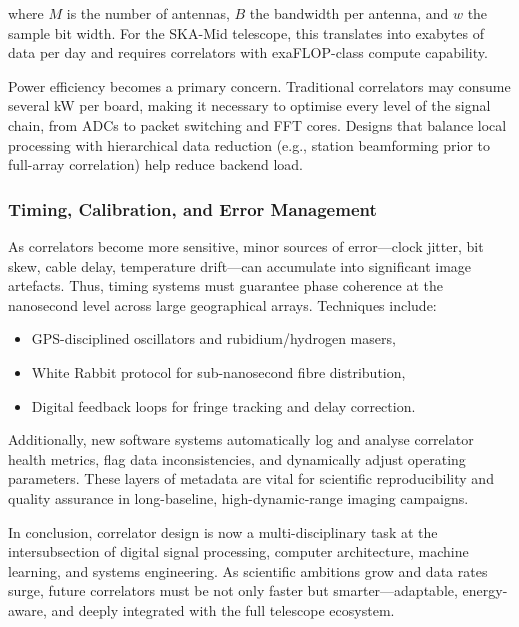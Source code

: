         where \( M \) is the number of antennas, \( B \) the bandwidth per antenna, and \( w \) the sample bit width. For the SKA-Mid telescope, this translates into exabytes of data per day and requires correlators with exaFLOP-class compute capability.
        
        Power efficiency becomes a primary concern. Traditional correlators may consume several kW per board, making it necessary to optimise every level of the signal chain, from ADCs to packet switching and FFT cores. Designs that balance local processing with hierarchical data reduction (e.g., station beamforming prior to full-array correlation) help reduce backend load.

        \subsubsection{Timing, Calibration, and Error Management}
        As correlators become more sensitive, minor sources of error—clock jitter, bit skew, cable delay, temperature drift—can accumulate into significant image artefacts. Thus, timing systems must guarantee phase coherence at the nanosecond level across large geographical arrays. Techniques include:
        
        \begin{itemize}
            \item GPS-disciplined oscillators and rubidium/hydrogen masers,
            
            \item White Rabbit protocol for sub-nanosecond fibre distribution,
            
            \item Digital feedback loops for fringe tracking and delay correction.
        \end{itemize}

        Additionally, new software systems automatically log and analyse correlator health metrics, flag data inconsistencies, and dynamically adjust operating parameters. These layers of metadata are vital for scientific reproducibility and quality assurance in long-baseline, high-dynamic-range imaging campaigns.

    \bigskip

     In conclusion, correlator design is now a multi-disciplinary task at the intersubsection of digital signal processing, computer architecture, machine learning, and systems engineering. As scientific ambitions grow and data rates surge, future correlators must be not only faster but smarter—adaptable, energy-aware, and deeply integrated with the full telescope ecosystem.